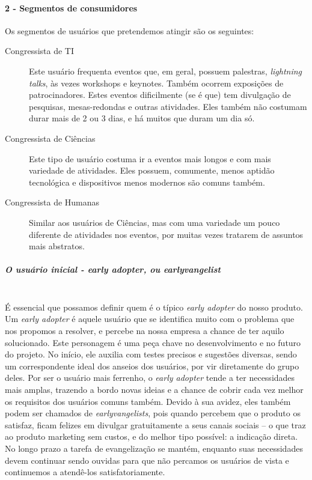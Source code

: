 \documentclass[12pt,a4paper,twoside,hyphens,english,brazil]{abntex2}
\newcommand{\hip}{{\color{BlueViolet}\framebox[1.1\width]{HIP}}}
\begin{document}
\paragraph*{2 - Segmentos de consumidores}
Os segmentos de usuários que pretendemos atingir são os seguintes:
\begin{description}
	\item[\hip{} Congressista de TI] Este usuário frequenta eventos que, em geral, possuem palestras, \emph{lightning talks}, às vezes workshops e keynotes. Também ocorrem exposições de patrocinadores. Estes eventos dificilmente (se é que) tem divulgação de pesquisas, mesas-redondas e outras atividades. Eles também não costumam durar mais de 2 ou 3 dias, e há muitos que duram um dia só.

	\item[\hip{} Congressista de Ciências] Este tipo de usuário costuma ir a eventos mais longos e com mais variedade de atividades. Eles possuem, comumente, menos aptidão tecnológica e dispositivos menos modernos são comuns também.

	\item[\hip{} Congressista de Humanas] Similar aos usuários de Ciências, mas com uma variedade um pouco diferente de atividades nos eventos, por muitas vezes tratarem de assuntos mais abstratos.
\end{description}

\subparagraph*{O usuário inicial - \emph{early adopter}, ou \emph{earlyvangelist}} ~\\
É essencial que possamos definir quem é o típico \emph{early adopter} do nosso produto. Um \emph{early adopter} é aquele usuário que se identifica muito com o problema que nos propomos a resolver, e percebe na nossa empresa a chance de ter aquilo solucionado. Este personagem é uma peça chave no desenvolvimento e no futuro do projeto. No início, ele auxilia com testes precisos e sugestões diversas, sendo um correspondente ideal dos anseios dos usuários, por vir diretamente do grupo deles. Por ser o usuário mais ferrenho, o \emph{early adopter} tende a ter necessidades mais amplas, trazendo a bordo novas ideias e a chance de cobrir cada vez melhor os requisitos dos usuários comuns também. Devido à sua avidez, eles também podem ser chamados de \emph{earlyvangelists}, pois quando percebem que o produto os satisfaz, ficam felizes em divulgar gratuitamente a seus canais sociais -- o que traz ao produto marketing sem custos, e do melhor tipo possível: a indicação direta. No longo prazo a tarefa de evangelização se mantém, enquanto suas necessidades devem continuar sendo ouvidas para que não percamos os usuários de vista e continuemos a atendê-los satisfatoriamente.
\end{document}
